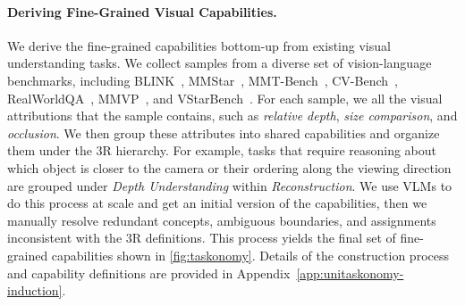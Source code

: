 \paragraph{Deriving Fine-Grained Visual Capabilities.}
We derive the fine-grained capabilities bottom-up from existing visual understanding tasks.
We collect samples from a diverse set of vision-language benchmarks, including BLINK~\citep{fu2024blink}, MMStar~\citep{chen2024wemmstar}, MMT-Bench~\citep{ying2024mmt}, CV-Bench~\citep{tong2024cambrian}, RealWorldQA~\citep{xai2024realworldqa}, MMVP~\citep{tong2024eyes}, and VStarBench~\citep{wu2024vstarbench}.
For each sample, we all the visual attributions that the sample contains, such as \emph{relative depth}, \emph{size comparison}, and \emph{occlusion}.
We then group these attributes into shared capabilities and organize them under the 3R hierarchy.
For example, tasks that require reasoning about which object is closer to the camera or their ordering along the viewing direction are grouped under \textit{Depth Understanding} within \textit{Reconstruction}.
We use VLMs to do this process at scale and get an initial version of the capabilities, then we manually resolve redundant concepts, ambiguous boundaries, and assignments inconsistent with the 3R definitions.
This process yields the final set of fine-grained capabilities shown in \autoref{fig:taskonomy}.
Details of the construction process and capability definitions are provided in Appendix~\ref{app:unitaskonomy-induction}.

